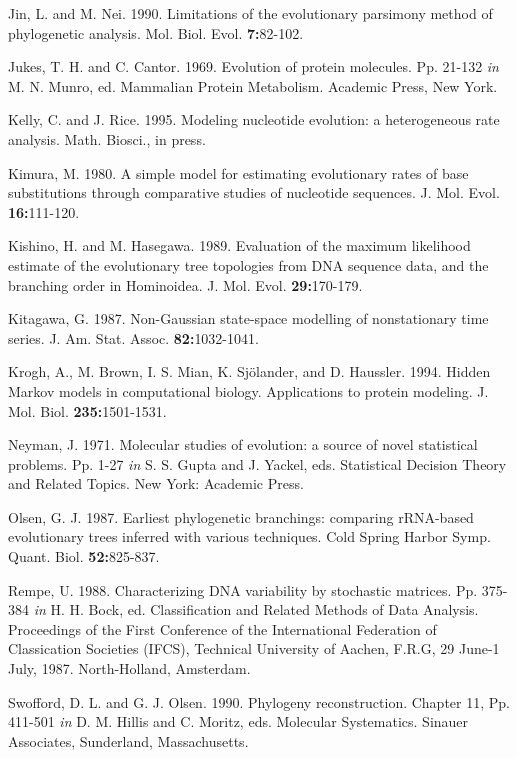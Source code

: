 \documentclass[12pt]{article}
\begin{document}
{{\sc Jin, L.} and {\sc M. Nei.}  1990.  Limitations of the evolutionary parsimony method of
phylogenetic analysis.  Mol. Biol. Evol. {\bf 7:}82-102.

{\sc Jukes, T. H.} and {\sc C. Cantor.} 1969.  Evolution of protein molecules.
Pp. 21-132 {\it in} {\sc M. N. Munro,} ed. Mammalian Protein Metabolism. Academic Press, New York.

{\sc Kelly, C.} and {\sc J. Rice.}  1995.  Modeling nucleotide evolution: a heterogeneous rate analysis.  Math. Biosci., in press.

{\sc Kimura, M.}  1980.  A simple model for estimating evolutionary rates of base
substitutions through comparative studies of nucleotide sequences.
J. Mol. Evol. {\bf 16:}111-120.

{\sc Kishino, H.} and {\sc M. Hasegawa.}  1989.  Evaluation of the maximum likelihood
estimate of the evolutionary tree topologies from DNA sequence data, and the
branching order in Hominoidea.  J. Mol. Evol. {\bf 29:}170-179.

{\sc Kitagawa, G.} 1987.  Non-Gaussian state-space modelling of nonstationary
time series.  J. Am. Stat. Assoc. {\bf 82:}1032-1041.

{\sc Krogh, A., M. Brown, I. S. Mian, K. Sj\"{o}lander,} and {\sc D.
Haussler.}  1994.  Hidden Markov models in computational biology. Applications
to protein modeling.  J. Mol. Biol. {\bf 235:}1501-1531.

{\sc Neyman, J.}  1971.  Molecular studies of evolution: a source of novel
statistical problems.  Pp. 1-27 {\it in} {\sc S. S. Gupta} and {\sc J. Yackel}, eds.  Statistical Decision Theory and Related Topics. New York: Academic Press.

{\sc Olsen, G. J.}  1987.  Earliest phylogenetic branchings: comparing rRNA-based
evolutionary trees inferred with various techniques.  Cold Spring Harbor
Symp. Quant. Biol. {\bf 52:}825-837.

{\sc Rempe, U.}   1988.    Characterizing DNA variability by stochastic matrices.
Pp. 375-384 {\it in} {\sc H. H. Bock}, ed.
Classification and Related Methods of Data Analysis.
Proceedings of the First Conference of the International Federation of
Classication Societies (IFCS), Technical University of Aachen, F.R.G,
29 June-1 July, 1987.  North-Holland, Amsterdam.

{\sc Swofford, D. L.} and {\sc G. J. Olsen.}  1990.  Phylogeny reconstruction.  Chapter 11,
Pp. 411-501 {\it in} {\sc D. M. Hillis} and {\sc C. Moritz}, eds.
Molecular Systematics. Sinauer Associates, Sunderland, Massachusetts.

}
\end{document}

